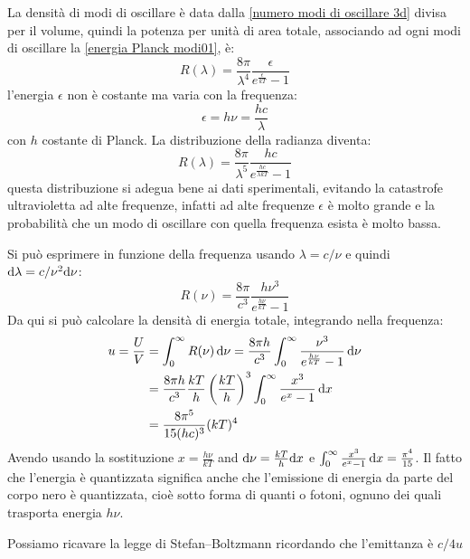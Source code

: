 La densità di modi di oscillare è data dalla \eqref{numero modi di oscillare 3d} divisa per il volume, quindi la potenza per unità di area totale, associando ad ogni modi di oscillare la \eqref{energia Planck modi01}, è:
\begin{equation}
	R(\lambda)=\frac{8\pi}{\lambda^4}\frac{\epsilon}{e^\frac{\epsilon}{kT}-1}
\end{equation}
l'energia $\epsilon$ non è costante ma varia con la frequenza:
\begin{equation}
	\epsilon=h\nu=\frac{hc}{\lambda}
\end{equation}
con $h$ costante di Planck. La distribuzione della radianza diventa:
\begin{equation}
	R(\lambda)=\frac{8\pi}{\lambda^5}\frac{hc}{e^\frac{hc}{\lambda kT}-1}
\end{equation}
questa distribuzione si adegua bene ai dati sperimentali, evitando la catastrofe ultravioletta ad alte frequenze, infatti ad alte frequenze $\epsilon$ è molto grande e la probabilità che un modo di oscillare con quella frequenza esista è molto bassa.

Si può esprimere in funzione della frequenza usando $\lambda=c/\nu$ e quindi $\mathrm{d}\lambda = c/\nu^2\mathrm{d}\nu$:
\begin{equation}
	R(\nu)=\frac{8\pi}{c^3}\frac{h\nu ^3}{e^\frac{h\nu}{kT}-1}
\end{equation}
Da qui si può calcolare la densità di energia totale, integrando nella frequenza:
\begin{equation}
	\begin{split}
		u=\frac{U}{V} &= \int_0^\infty R(\nu)\,\mathrm{d}\nu = \frac{8\pi h}{c^3} \int_0^\infty \frac{\nu ^3}{e^\frac{h\nu}{kT}-1}\,\mathrm{d}\nu \\
		&= \frac{8\pi h}{c^3}\frac{kT}{h}\left(\frac{kT}{h}\right)^3 \int_0^\infty \frac{x^3}{e^x-1}\,\mathrm{d} x \\
		&= \frac{8\pi^5}{15 (hc)^3}(kT)^4
	\end{split}
\end{equation}
Avendo usando la sostituzione $x=\frac{h\nu}{kT}$ and $\mathrm{d} \nu = \frac{kT}{h}\mathrm{d} x$ e $\int_0^\infty\frac{x^3}{e^x-1}\,\mathrm{d} x = \frac{\pi^4}{15}$.
Il fatto che l'energia è quantizzata significa anche che l'emissione di energia da parte del corpo nero è quantizzata, cioè sotto forma di quanti o fotoni, ognuno dei quali trasporta energia $h\nu$.

Possiamo ricavare la legge di Stefan--Boltzmann ricordando che l'emittanza è $c/4 u$

